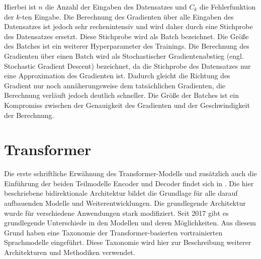 Hierbei ist $n$ die Anzahl der Eingaben des Datensatzes und $C_k$ die Fehlerfunktion der $k$-ten Eingabe.
Die Berechnung des Gradienten über alle Eingaben des Datensatzes ist jedoch sehr rechenintensiv und wird daher durch eine Stichprobe des Datensatzes ersetzt.
Diese Stichprobe wird als Batch bezeichnet.
Die Größe des Batches ist ein weiterer Hyperparameter des Trainings.
Die Berechnung des Gradienten über einen Batch wird als Stochastischer Gradientenabstieg (engl.
Stochastic Gradient Descent) bezeichnet, da die Stichprobe des Datensatzes nur eine Approximation des Gradienten ist.
Dadurch gleicht die Richtung des Gradient nur noch annäherungsweise dem tatsächlichen Gradienten, die Berechnung verläuft jedoch deutlich schneller.
Die Größe der Batches ist ein Kompromiss zwischen der Genauigkeit des Gradienten und der Geschwindigkeit der Berechnung.\\

\section{Transformer}\label{sec:grundlagen:transformer}
%
Die erste schriftliche Erwähnung des Transformer-Modells und zusätzlich auch die Einführung der beiden Teilmodelle Encoder und Decoder findet sich in \citet{attention}.
Die hier beschriebene bidirektionale Architektur bildet die Grundlage für alle darauf aufbauenden Modelle und Weiterentwicklungen.
Die grundlegende Architektur wurde für verschiedene Anwendungen stark modifiziert.
Seit 2017 gibt es grundlegende Unterschiede in den Modellen und deren Möglichkeiten.
Aus diesem Grund haben \citet{ammus} eine Taxonomie der Transformer-basierten vortrainierten Sprachmodelle eingeführt.
Diese Taxonomie wird hier zur Beschreibung weiterer Architekturen und Methodiken verwendet.\\

